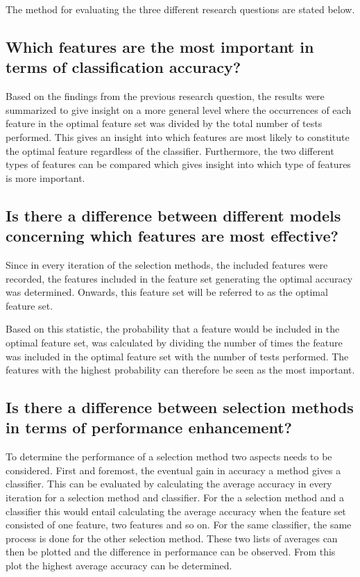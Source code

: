 \documentclass{kththesis}
\begin{document}
The method for evaluating the three different research questions are stated below.

\subsection{Which features are the most important in terms of classification accuracy?}
Based on the findings from the previous research question, the results were summarized to give insight on a more general level where the occurrences of each feature in the optimal feature set was divided by the total number of tests performed. This gives an insight into which features are most likely to constitute the optimal feature regardless of the classifier. Furthermore, the two different types of features can be compared which gives insight into which type of features is more important.

\subsection{Is there a difference between different models concerning which features are most effective?}
Since in every iteration of the selection methods, the included features were recorded, the features included in the feature set generating the optimal accuracy was determined. Onwards, this feature set will be referred to as the optimal feature set. 

Based on this statistic, the probability that a feature would be included in the optimal feature set, was calculated by dividing the number of times the feature was included in the optimal feature set with the number of tests performed. The features with the highest probability can therefore be seen as the most important.


\subsection{Is there a difference between selection methods in terms of performance enhancement?}

To determine the performance of a selection method two aspects needs to be considered. First and foremost, the eventual gain in accuracy a method gives a classifier. This can be evaluated by calculating the average accuracy in every iteration for a selection method and classifier. For the a selection method and a classifier this would entail calculating the average accuracy when the feature set consisted of one feature, two features and so on. For the same classifier, the same process is done for the other selection method. These two lists of averages can then be plotted and the difference in performance can be observed. From this plot the highest average accuracy can be determined. 
\end{document}
